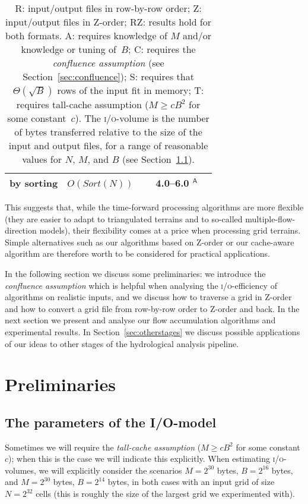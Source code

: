 \documentclass[10pt,a4paper]{article}
\def\io{\textsc{i/o}\xspace}
\def\sort{\mathit{Sort}}
\begin{document}
\begin{table}
\begin{tabularx}{\hsize}{|Xr|lr|r|r|}
\multicolumn{2}{|l|}{by sorting} & \multicolumn{2}{c|}{$O(\sort(N))${ $^{\textsf{\hphantom{TA}}}$}} & 4.0--6.0{ $^{\textsf{A}}$} & \\
\hline
\end{tabularx}
\caption{\textsf{R}: input/output files in row-by-row order;\quad
\textsf{Z}: input/output files in Z-order;\quad
\textsc{RZ}: results hold for both formats.\quad
\textsf{A}: requires knowledge of $M$ and/or knowledge or tuning of~$B$;\quad
\textsf{C}: requires the \emph{confluence assumption} (see Section~\ref{sec:confluence});\quad
\textsf{S}: requires that $\Theta(\sqrt B)$ rows of the input fit in memory;\quad
\textsf{T}: requires tall-cache assumption ($M \geq c B^2$ for some constant~$c$).\hfill\break
The \io-volume is the number of bytes transferred relative to the size of the input and output files, for a range of reasonable values for $N$, $M$, and $B$ (see Section~\ref{sec:parameters}).}
\label{tab:results}
\end{table}
This suggests that, while the time-forward processing algorithms are more flexible (they are easier to adapt to triangulated terrains and to so-called multiple-flow-direction models), their flexibility comes at a price when processing grid terrains. Simple alternatives such as our algorithms based on Z-order or our cache-aware algorithm are therefore worth to be considered for practical applications.

In the following section we discuss some preliminaries: we introduce the \emph{confluence assumption} which is helpful when analysing the \io-efficiency of algorithms on realistic inputs, and we discuss how to traverse a grid in Z-order and how to convert a grid file from row-by-row order to Z-order and back. In the next section we present and analyse our flow accumulation algorithms and experimental results.
In Section~\ref{sec:otherstages} we discuss possible applications of our ideas to other stages of the hydrological analysis pipeline.

\section{Preliminaries}

\subsection{The parameters of the I/O-model}
\label{sec:parameters}
Sometimes we will require the \emph{tall-cache assumption} ($M \geq c B^2$ for some constant $c$); when this is the case we will indicate this explicitly.
When estimating \io-volumes, we will explicitly consider the scenarios $M = 2^{30}$ bytes, $B = 2^{16}$ bytes, and $M = 2^{30}$ bytes, $B = 2^{14}$ bytes, in both cases with an input grid of size $N = 2^{32}$ cells (this is roughly the size of the largest grid we experimented with).
\end{document}
